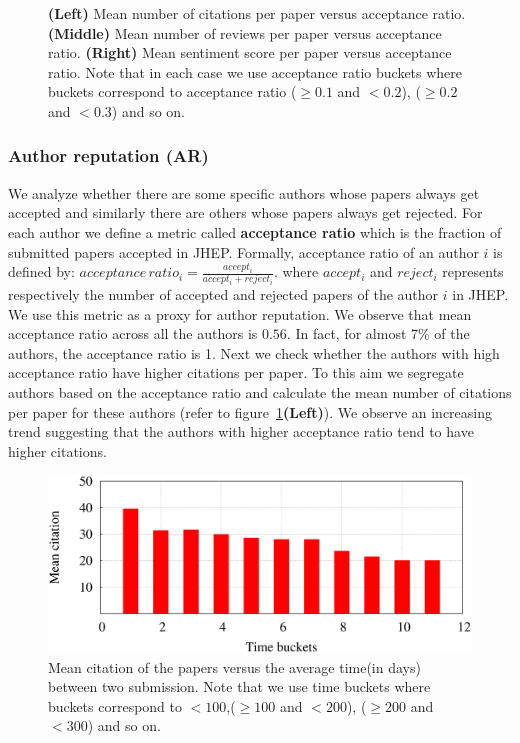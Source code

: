 \begin{figure}
\begin{tabular}{ccc}
\end{tabular}
\caption{{\bf (Left)} Mean number of citations per paper versus acceptance ratio. {\bf (Middle)} Mean number of reviews per paper versus acceptance ratio. {\bf (Right)} Mean sentiment score per paper versus acceptance ratio. Note that in each case we use acceptance ratio buckets where buckets correspond to acceptance ratio ($\geq 0.1$ and $< 0.2$), ($\geq 0.2$ and $<0.3$) and so on.}
\label{fig13}
\end{figure}
\subsubsection*{Author reputation (AR)} We analyze whether there are some specific authors whose papers always get accepted and similarly there are others whose papers always get rejected.  
For each author we define a metric called {\bf acceptance ratio} which is the fraction of submitted papers accepted in JHEP. Formally, acceptance ratio of an author $i$ is defined by: $acceptance\,ratio_{i}=\frac{accept_{i}}{accept_{i} + reject_{i}}$.    
where $accept_{i}$ and $reject_{i}$ represents respectively the number of accepted and rejected papers of the author $i$ in JHEP. We use this metric as a proxy for author reputation.
We observe that mean acceptance ratio across all the authors is $0.56$. In fact, for almost 7\% of the authors, the acceptance ratio is 1. Next we check whether the authors with high acceptance ratio have higher citations per paper. To this aim we segregate authors based on the acceptance ratio and calculate the mean number of citations per paper for these authors (refer to figure~\ref{fig13}{\bf (Left)}). We observe an increasing trend suggesting that the authors with higher acceptance ratio tend to have higher citations. 
\iffalse
\begin{figure}
\centering
\includegraphics[scale=0.25]{./texfiles/Chapter_4/jcdl/figures/prod_citation.eps}
\caption{Mean citation of the papers versus the average time(in days) between two submission. Note that  we use time buckets where buckets correspond to $<100$,($\geq 100$ and $< 200$), ($\geq 200$ and $<300$) and so on.\vspace{-2mm}}
\label{fig:prod}
\end{figure}
